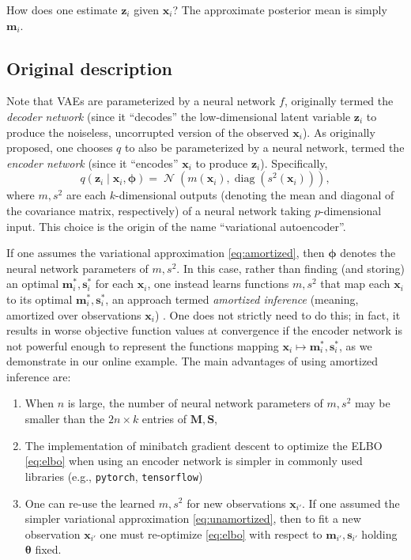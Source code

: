 \documentclass[reqno,11pt]{amsart}
\DeclareMathOperator\diag{diag}
\DeclareMathOperator\N{\mathcal{N}}
\newcommand\mm{\mathbf{M}}
\newcommand\ms{\mathbf{S}}
\newcommand\vm{\mathbf{m}}
\newcommand\vphi{\boldsymbol{\phi}}
\newcommand\vs{\mathbf{s}}
\newcommand\vtheta{\boldsymbol{\theta}}
\newcommand\vx{\mathbf{x}}
\newcommand\vz{\mathbf{z}}
\begin{document}
How does one estimate $\vz_i$ given $\vx_i$? The approximate posterior mean is
simply $\vm_i$.

\subsection{Original description}

Note that VAEs are parameterized by a neural network $f$, originally termed the
\emph{decoder network} (since it ``decodes'' the low-dimensional latent
variable $\vz_i$ to produce the noiseless, uncorrupted version of the observed
$\vx_i$). As originally proposed, one chooses $q$ to also be parameterized by a
neural network, termed the \emph{encoder network} (since it ``encodes'' $\vx_i$
to produce $\vz_i$). Specifically,
%
\begin{equation}
  q(\vz_i \mid \vx_i, \vphi) = \N(m(\vx_i), \diag(s^2(\vx_i))),
  \label{eq:amortized}
\end{equation}
%
where $m, s^2$ are each $k$-dimensional outputs (denoting the mean and diagonal
of the covariance matrix, respectively) of a neural network taking
$p$-dimensional input. This choice is the origin of the name ``variational
autoencoder''.

If one assumes the variational approximation \eqref{eq:amortized}, then $\vphi$
denotes the neural network parameters of $m, s^2$. In this case, rather than
finding (and storing) an optimal $\vm_i^*, \vs_i^*$ for each $\vx_i$, one
instead learns functions $m, s^2$ that map each $\vx_i$ to its optimal
$\vm_i^*, \vs_i^*$, an approach termed \emph{amortized inference} (meaning,
amortized over observations $\vx_i$) \cite{Gershman2014}. One does not strictly
need to do this; in fact, it results in worse objective function values at
convergence if the encoder network is not powerful enough to represent the
functions mapping $\vx_i \mapsto \vm_i^*, \vs_i^*$, as we demonstrate in our
online example. The main advantages of using amortized inference are:

\begin{enumerate}
\item When $n$ is large, the number of neural network parameters of $m, s^2$
  may be smaller than the $2n \times k$ entries of $\mm, \ms$,
\item The implementation of minibatch gradient descent to optimize the ELBO
  \eqref{eq:elbo} when using an encoder network is simpler in commonly used
  libraries (e.g., \texttt{pytorch}, \texttt{tensorflow})
\item One can re-use the learned $m, s^2$ for new observations $\vx_{i'}$. If
  one assumed the simpler variational approximation \eqref{eq:unamortized},
  then to fit a new observation $\vx_{i'}$ one must re-optimize \eqref{eq:elbo}
  with respect to $\vm_{i'}, \vs_{i'}$ holding $\vtheta$ fixed.
\end{enumerate}

\printbibliography
\end{document}
